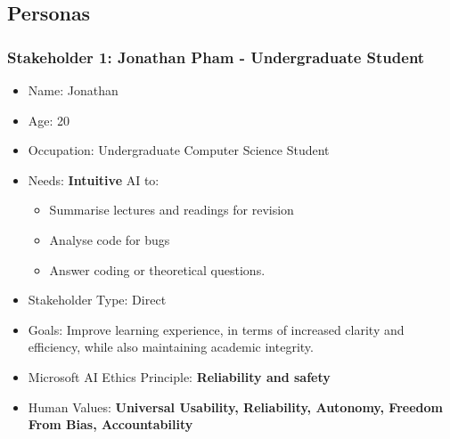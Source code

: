 \subsection{Personas}

\subsubsection{Stakeholder 1: Jonathan Pham - Undergraduate Student}

\begin{itemize}
\item Name: Jonathan
\item Age: 20
\item Occupation: Undergraduate Computer Science Student
\item Needs: \textbf{Intuitive} AI to:
  \begin{itemize}
  \item Summarise lectures and readings for revision
  \item Analyse code for bugs
  \item Answer coding or theoretical questions.
  \end{itemize}
\item Stakeholder Type: Direct
\item Goals: Improve learning experience, in terms of increased clarity and efficiency, while also maintaining academic integrity.
\item Microsoft AI Ethics Principle: \textbf{Reliability and safety}
\item Human Values: \textbf{Universal Usability, Reliability, Autonomy, Freedom From Bias, Accountability}
\end{itemize}

